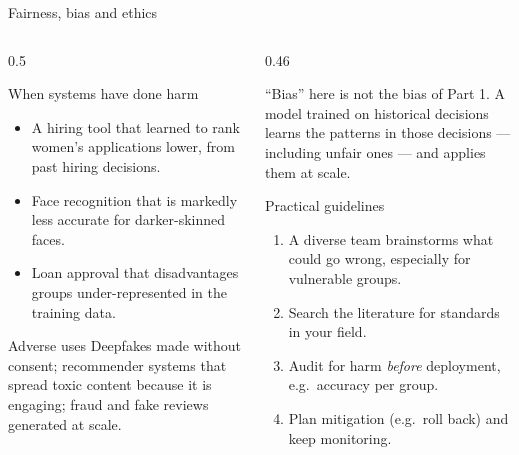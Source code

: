 \documentclass[aspectratio=169,10pt]{beamer}
\begin{document}
\begin{frame}{Fairness, bias and ethics}
  \begin{columns}[T,onlytextwidth]
    \begin{column}{0.5\textwidth}
      \footnotesize
      \begin{block}{When systems have done harm}
        \begin{itemize}
          \item A hiring tool that learned to rank women's applications lower, from past
                hiring decisions.
          \item Face recognition that is markedly less accurate for darker-skinned faces.
          \item Loan approval that disadvantages groups under-represented in the training
                data.
        \end{itemize}
      \end{block}
      \begin{block}{Adverse uses}
        Deepfakes made without consent; recommender systems that spread toxic content
        because it is engaging; fraud and fake reviews generated at scale.
      \end{block}
    \end{column}
    \begin{column}{0.46\textwidth}
      \footnotesize
      \begin{keyidea}
        ``Bias'' here is not the bias of Part 1. A model trained on historical decisions
        learns the patterns in those decisions --- including unfair ones --- and applies
        them at scale.
      \end{keyidea}
      \begin{block}{Practical guidelines}
        \begin{enumerate}
          \item A diverse team brainstorms what could go wrong, especially for
                vulnerable groups.
          \item Search the literature for standards in your field.
          \item Audit for harm \emph{before} deployment, e.g.\ accuracy per group.
          \item Plan mitigation (e.g.\ roll back) and keep monitoring.
        \end{enumerate}
      \end{block}
    \end{column}
  \end{columns}
\end{frame}
\end{document}
